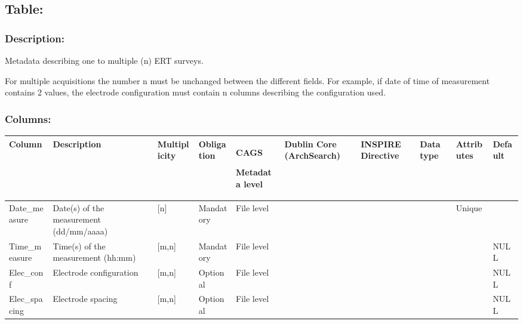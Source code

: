 \documentclass[letterpaper,10pt,english]{sphinxmanual}
\begin{document}
\subsection{Table: }
\label{\detokenize{schema_documentation:table-ert-metadata}}

\subsubsection{Description:}
\label{\detokenize{schema_documentation:description-2}}\label{\detokenize{schema_documentation:id20}}
Metadata describing one to multiple (n) ERT surveys.

For multiple acquisitions the number n must be unchanged between the
different fields. For example, if date of time of measurement contains 2
values, the electrode configuration must contain n columns describing
the configuration used.


\subsubsection{Columns:}
\label{\detokenize{schema_documentation:columns-3}}\label{\detokenize{schema_documentation:id21}}

\begin{savenotes}\sphinxattablestart
\centering
\begin{tabulary}{\linewidth}[t]{|T|T|T|T|T|T|T|T|T|T|}
\hline
\sphinxstyletheadfamily 
Column
&\sphinxstyletheadfamily 
Description
&\sphinxstyletheadfamily 
Multiplicity
&\sphinxstyletheadfamily 
Obligation
&\sphinxstyletheadfamily 
CAGS

Metadata level
&\sphinxstyletheadfamily 
Dublin Core (ArchSearch)
&\sphinxstyletheadfamily 
INSPIRE Directive
&\sphinxstyletheadfamily 
Data type
&\sphinxstyletheadfamily 
Attributes
&\sphinxstyletheadfamily 
Default
\\
\hline
Date\_measure
&
Date(s) of the measurement (dd/mm/aaaa)
&
{[}n{]}
&
Mandatory
&
File level
&&&&
Unique
&\\
\hline
Time\_measure
&
Time(s) of the measurement (hh:mm)
&
{[}m,n{]}
&
Mandatory
&
File level
&&&&&
NULL
\\
\hline
Elec\_conf
&
Electrode   configuration
&
{[}m,n{]}
&
Optional
&
File   level
&&&&&
NULL
\\
\hline
Elec\_spacing
&
Electrode spacing
&
{[}m,n{]}
&
Optional
&
File level
&&&&&
NULL
\\
\hline
\end{tabulary}
\par
\sphinxattableend\end{savenotes}
\end{document}
